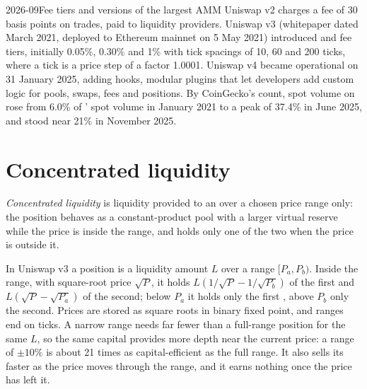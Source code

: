 \begin{dated}{2026-09}{Fee tiers and versions of the largest AMM}\label{dat:m3:automated-market-makers:uniswap}
Uniswap v2 charges a fee of 30 basis points on trades, paid to liquidity providers. Uniswap v3 (whitepaper dated March 2021, deployed to
Ethereum mainnet on 5 May 2021)
introduced  and fee tiers, initially 0.05\%, 0.30\% and 1\% with tick spacings of 10, 60 and 200 ticks,
where a tick is a price step of a factor 1.0001. Uniswap v4 became operational on 31 January 2025, adding hooks, modular plugins
that let developers add custom logic for pools, swaps, fees and positions. By CoinGecko's count, spot volume on 
rose from 6.0\% of ' spot volume in January 2021 to a peak of 37.4\% in June 2025, and stood near 21\% in November 2025.
\end{dated}

\section{Concentrated liquidity}

\begin{definition}\label{def:m3:automated-market-makers:concentrated}
\emph{Concentrated liquidity} is liquidity provided to an  over a chosen
price range only: the position behaves as a constant-product pool with a larger virtual reserve while the price is inside
the range, and holds only one of the two  when the price is outside it.
\end{definition}

In Uniswap v3 a position is a liquidity amount $L$ over a range $[P_a, P_b)$. Inside the range, with square-root price
$\sqrt{P}$, it holds $L(1/\sqrt{P} - 1/\sqrt{P_b})$ of the first  and $L(\sqrt{P} - \sqrt{P_a})$ of the second; below
$P_a$ it holds only the first , above $P_b$ only the second. Prices are stored as square roots in binary fixed point,
and ranges end on ticks. A narrow range needs far fewer  than a full-range position for the same $L$, so the same
capital provides more depth near the current price: a range of $\pm10\%$ is about 21 times as capital-efficient as the
full range. It also sells its  faster as the price moves through the range, and it earns nothing once the price has
left it.

